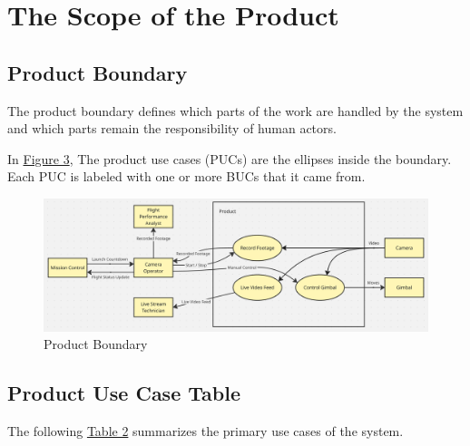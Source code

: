 \documentclass[12pt]{article}
\begin{document}
\section{The Scope of the Product}
\subsection{Product Boundary}

The product boundary defines which parts of the work are handled by the system
and which parts remain the responsibility of human actors.

In \hyperref[img:product-boundary]{Figure 3}, The product use cases (PUCs) are
the ellipses inside the boundary. Each PUC is labeled with one or more BUCs
that it came from.

\begin{figure}[H]
  \centering
  \includegraphics[width=\textwidth,height=\textheight,keepaspectratio]{../Images/product_boundary.png}
  \caption{Product Boundary}
  \label{img:product-boundary}
\end{figure}

\subsection{Product Use Case Table}

The following \hyperref[tab:product-use-case-table]{Table 2} summarizes the
primary use cases of the system.
\end{document}
